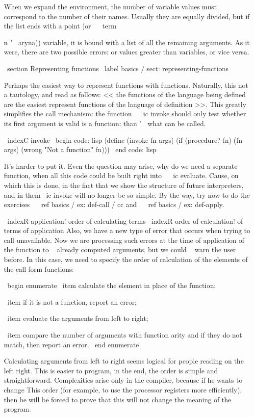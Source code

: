 {When we expand the environment, the number of variable values ​​must
correspond to the number of their names. Usually they are equally divided, but if the list
ends with a point (or ~ \ term {n "~ aryna)) variable, it is bound
with a list of all the remaining arguments. As it were, there are two possible errors:
or values ​​greater than variables, or vice versa.


\ section {Representing functions} \ label {basics / sect: representing-functions}

Perhaps the easiest way to represent functions with functions. Naturally, this
not a tautology, and read as follows: << the functions of the language being defined are the easiest
represent functions of the language of definition >>. This greatly simplifies the call mechanism:
the function ~ \ ic {invoke} should only test whether its first argument is valid
is a function: than "~ what can be called.

\ indexC {invoke}
\ begin {code: lisp}
(define (invoke fn args)
  (if (procedure? fn) (fn args)
      (wrong "Not a function" fn)))
\ end {code: lisp}

It's harder to put it. Even the question may arise, why do we need a separate
function, when all this code could be built right into ~ \ ic {evaluate}. Cause,
on which this is done, in the fact that we show the structure of future
interpreters, and in them \ ic {invoke} will no longer be so simple. By the way,
try now to do the exercises ~ \ ref {basics / ex: def-call / cc}
and ~ \ ref {basics / ex: def-apply}.

\ indexR {application! order of calculating terms}
\ indexR {order of calculation! of terms of application}
Also, we have a new type of error that occurs when trying to call
unavailable. Now we are processing such errors at the time of application of the function
to ~ already computed arguments, but we could ~ warn the user before.
In this case, we need to specify the order of calculation of the elements of the call form
functions:

\ begin {enumerate}
  \ item calculate the element in place of the function;

  \ item if it is not a function, report an error;

  \ item evaluate the arguments from left to right;

  \ item compare the number of arguments with function arity
        and if they do not match, then report an error.
\ end {enumerate}

Calculating arguments from left to right seems logical for people reading on the left
right. This is easier to program, in the end, the order is simple and straightforward.
Complexities arise only in the compiler, because if he wants to change
This order (for example, to use the processor registers more efficiently), then
he will be forced to prove that this will not change the meaning of the program.

}}
